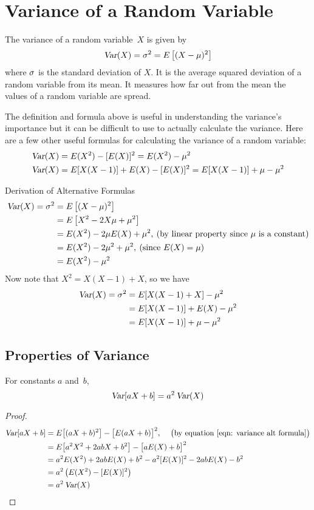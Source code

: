 \section{Variance of a Random Variable}
The variance of a random variable~$X$ is given by
\[
    \operatorname{\textsl{Var}}(X) = \sigma^2 = E\left[(X - \mu)^2\right]
\]
where $\sigma$ is the standard deviation of $X$. It is the average squared deviation of a random variable from its mean. It measures how far out from the mean the values of a random variable are spread.
\smallskip\par
The definition and formula above is useful in understanding the variance's importance but it can be difficult to use to actually calculate the variance. Here are a few other useful formulas for calculating the variance of a random variable:
\begin{align}
    \operatorname{\textsl{Var}}(X) &= E(X^2) - [E(X)]^2 = E(X^2) - \mu^2 \label{eqn: variance alt formula}\\
    \operatorname{\textsl{Var}}(X) &= E[X(X-1)] + E(X) - [E(X)]^2 = E[X(X-1)] + \mu - \mu^2
\end{align}
\begin{theory}{Derivation of Alternative Formulas}
\begin{align*}
    \operatorname{\textsl{Var}}(X) = \sigma^2 
    &= E\left[(X - \mu)^2\right] \\
    &= E\left[X^2 -2X\mu + \mu^2\right] \\
    &= E(X^2) - 2\mu E(X) + \mu^2,\:\text{(by linear property since $\mu$ is a constant)} \\
    &= E(X^2) - 2\mu^2 + \mu^2,\:\text{(since $E(X) = \mu$)} \\
    &= E(X^2) - \mu^2
\end{align*}
Now note that $X^2 = X(X-1) + X$, so we have
\begin{align*}
    \operatorname{\textsl{Var}}(X) = \sigma^2
    &= E[X(X-1) + X]  - \mu^2 \\
    &= E[X(X-1)] + E(X) -\mu^2 \\
    &= E[X(X-1)] + \mu -\mu^2
\end{align*}
\end{theory}
\subsection*{Properties of Variance}
\begin{theorem}
For constants $a$ and~$b$,
\[
    \operatorname{\textsl{Var}}[aX + b] = a^2\operatorname{\textsl{Var}}(X)
\]
\end{theorem}
\begin{proof}
\begin{align*}
    \operatorname{\textsl{Var}}[aX + b]
    &= E\bigl[(aX + b)^2\bigr] - \bigl[E(aX + b)\bigr]^2,\hspace{12pt}\text{\big (by equation \eqref{eqn: variance alt formula}\big)} \\
    &= E\bigl[a^2 X^2 + 2abX + b^2\bigr] - \bigl[aE(X) + b\bigr]^2 \\
    &= a^2 E(X^2) + 2ab E(X) + b^2 - a^2[E(X)]^2 - 2abE(X) - b^2 \\
    &= a^2 \left(E(X^2) - [E(X)]^2\right) \\
    &= a^2 \operatorname{\textsl{Var}}(X)
\end{align*}
\end{proof}